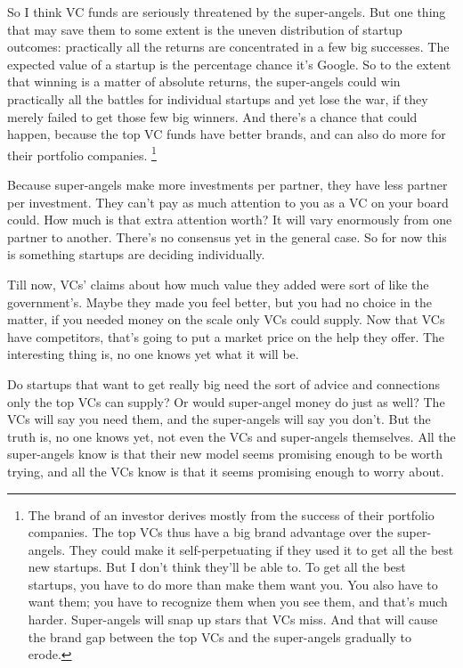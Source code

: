 So I think VC funds are seriously threatened by the super-angels. But
one thing that may save them to some extent is the uneven distribution
of startup outcomes: practically all the returns are concentrated in a
few big successes. The expected value of a startup is the percentage
chance it's Google. So to the extent that winning is a matter of
absolute returns, the super-angels could win practically all the battles
for individual startups and yet lose the war, if they merely failed to
get those few big winners. And there's a chance that could happen,
because the top VC funds have better brands, and can also do more for
their portfolio companies. \footnote{The brand of an investor derives mostly from the success of
their portfolio companies. The top VCs thus have a big brand advantage
over the super-angels. They could make it self-perpetuating if they used
it to get all the best new startups. But I don't think they'll be able
to. To get all the best startups, you have to do more than make them
want you. You also have to want them; you have to recognize them when
you see them, and that's much harder. Super-angels will snap up stars
that VCs miss. And that will cause the brand gap between the top VCs and
the super-angels gradually to erode.}

Because super-angels make more investments per partner, they have less
partner per investment. They can't pay as much attention to you as a VC
on your board could. How much is that extra attention worth? It will
vary enormously from one partner to another. There's no consensus yet in
the general case. So for now this is something startups are deciding
individually.

Till now, VCs' claims about how much value they added were sort of like
the government's. Maybe they made you feel better, but you had no choice
in the matter, if you needed money on the scale only VCs could supply.
Now that VCs have competitors, that's going to put a market price on the
help they offer. The interesting thing is, no one knows yet what it will
be.

Do startups that want to get really big need the sort of advice and
connections only the top VCs can supply? Or would super-angel money do
just as well? The VCs will say you need them, and the super-angels will
say you don't. But the truth is, no one knows yet, not even the VCs and
super-angels themselves. All the super-angels know is that their new
model seems promising enough to be worth trying, and all the VCs know is
that it seems promising enough to worry about.

